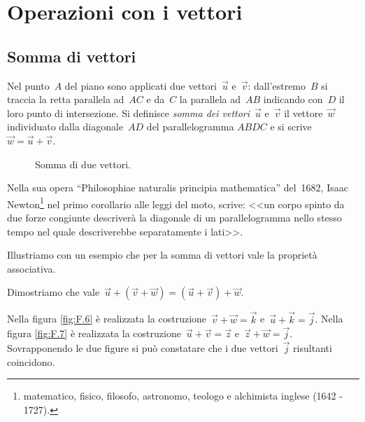 \ovalbox{\risolvi \ref{ese:B.1}}

\section{Operazioni con i vettori}

\subsection{Somma di vettori}

\begin{definizione}
Nel punto~$A$ del piano sono applicati due vettori~$\vec{u}$ e~$\vec{v}$: dall'estremo~$B$ si
traccia la retta parallela ad~$AC$ e da~$C$ la parallela ad~$AB$ indicando con~$D$ il loro punto di intersezione.
Si definisce \emph{somma dei vettori}~$\vec{u}$ e~$\vec{v}$ il vettore~$\vec{w}$ individuato dalla diagonale~$AD$ del parallelogramma $ABDC$ e si scrive~$\vec{w}=\vec{u}+\vec{v}$.
\end{definizione}

\begin{figure}[h]
\centering

 \caption{Somma di due vettori.}\label{fig:F.5}
\end{figure}

Nella sua opera ``Philosophiae naturalis principia mathematica'' del~1682, Isaac Newton\footnote{matematico, fisico, filosofo, astronomo, teologo e alchimista inglese (1642 - 1727).} nel primo corollario alle leggi del moto,
scrive: <<un corpo spinto da due forze congiunte descriverà la diagonale di un parallelogramma nello stesso tempo nel quale descriverebbe separatamente i lati>>.

\vspazio\ovalbox{\risolvi \ref{ese:B.2}}

Illustriamo con un esempio che per la somma di vettori vale la proprietà associativa.

\begin{exrig}
\begin{esempio}
Dimostriamo che vale~$\vec{u}+(\vec{v}+\vec{w})=(\vec{u}+\vec{v})+\vec{w}$.

Nella figura \ref{fig:F.6} è realizzata la costruzione~$\vec{v}+\vec{w}=\vec{k}$ e~$\vec{u}+\vec{k}=\vec{j}$.
Nella figura \ref{fig:F.7} è realizzata la costruzione~$\vec{u}+\vec{v}=\vec{z}$ e~$\vec{z}+\vec{w}=\vec{j}$.
Sovrapponendo le due figure si può constatare che i due vettori~$\vec{j}$ risultanti coincidono.
\end{esempio}
\end{exrig}

